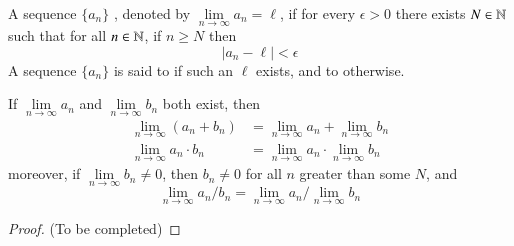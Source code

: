 \begin{defn}
    A sequence $\{a_n\}$ , denoted by $\lim\limits_{n\rightarrow \infty}a_n = \ell$, if for every $\epsilon > 0$ there exists $N \in \mathbb N$ such that for all $n \in \mathbb N$, if $n \geq N$ then \begin{equation*}
        |a_n - \ell| < \epsilon
    \end{equation*}
    A sequence $\{a_n\}$ is said to  if such an $\ell$ exists, and to  otherwise.
\end{defn}

\begin{thm}
    If $\lim\limits_{n\rightarrow \infty}a_n$ and $\lim\limits_{n\rightarrow \infty}b_n$ both exist, then \begin{align*}
        \lim\limits_{n\rightarrow \infty}(a_n+b_n) &= \lim\limits_{n\rightarrow \infty}a_n + \lim\limits_{n\rightarrow \infty}b_n \\
        \lim\limits_{n\rightarrow \infty}a_n\cdot b_n &= \lim\limits_{n\rightarrow \infty}a_n\cdot \lim\limits_{n\rightarrow \infty} b_n 
    \end{align*}
    moreover, if $\lim\limits_{n\rightarrow \infty}b_n\neq 0$, then $b_n \neq 0$ for all $n$ greater than some $N$, and \begin{equation*}
        \lim\limits_{n\rightarrow \infty}a_n/b_n = \lim\limits_{n\rightarrow \infty}a_n/\lim\limits_{n\rightarrow \infty}b_n
    \end{equation*}
\end{thm}
\begin{proof}
    (To be completed)
\end{proof}



